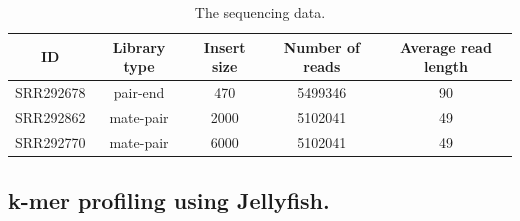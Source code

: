 \documentclass{article}
\begin{document}
	\begin{table} 
	\centering
	\begin{tabular}{|c|c|c|c|c|}
		\hline
		ID & Library type & Insert size & Number of reads & Average read length \\
		\hline
		SRR292678 & pair-end  & 470 & 5499346 & 90\\
		\hline
		SRR292862 & mate-pair & 2000 &  5102041 & 49\\
		\hline
		SRR292770 & mate-pair & 6000&   5102041  & 49\\
		\hline
	\end{tabular}
	\caption{  The sequencing data. }
	\label{tab:1}
\end{table}

\subsection{k-mer profiling using Jellyfish.}
\end{document}
